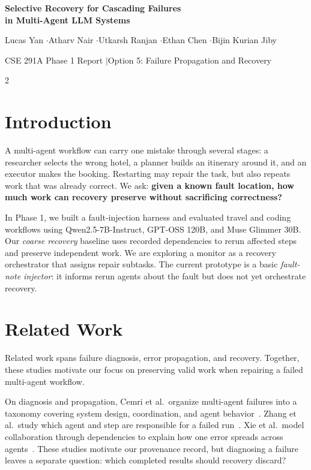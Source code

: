 \documentclass[9pt]{extarticle}
\begin{document}
\begin{center}
{\Large\bfseries Selective Recovery for Cascading Failures\\in Multi-Agent LLM Systems\par}
\vspace{4pt}
{\normalsize Lucas Yan \enspace$\cdot$\enspace Atharv Nair \enspace$\cdot$\enspace Utkarsh Ranjan \enspace$\cdot$\enspace Ethan Chen \enspace$\cdot$\enspace Bijin Kurian Jiby\par}
\vspace{3pt}
{\normalsize CSE 291A Phase 1 Report \enspace$\mid$\enspace Option 5: Failure Propagation and Recovery}
\end{center}
\vspace{-5pt}

\begin{multicols}{2}
\raggedcolumns
\section{Introduction}
A multi-agent workflow can carry one mistake through several stages: a researcher selects the wrong hotel, a planner builds an itinerary around it, and an executor makes the booking. Restarting may repair the task, but also repeats work that was already correct. We ask: \textbf{given a known fault location, how much work can recovery preserve without sacrificing correctness?}

In Phase 1, we built a fault-injection harness and evaluated travel and coding workflows using Qwen2.5-7B-Instruct, GPT-OSS 120B, and Muse Glimmer 30B. Our \emph{coarse recovery} baseline uses recorded dependencies to rerun affected steps and preserve independent work. We are exploring a monitor as a recovery orchestrator that assigns repair subtasks. The current prototype is a basic \emph{fault-note injector}: it informs rerun agents about the fault but does not yet orchestrate recovery.

\section{Related Work}
Related work spans failure diagnosis, error propagation, and recovery. Together, these studies motivate our focus on preserving valid work when repairing a failed multi-agent workflow.

On diagnosis and propagation, Cemri et al.\ organize multi-agent failures into a taxonomy covering system design, coordination, and agent behavior~\cite{mast}. Zhang et al.\ study which agent and step are responsible for a failed run~\cite{whowhen}. Xie et al.\ model collaboration through dependencies to explain how one error spreads across agents~\cite{cascades}. These studies motivate our provenance record, but diagnosing a failure leaves a separate question: which completed results should recovery discard?


\end{multicols}
\end{document}
